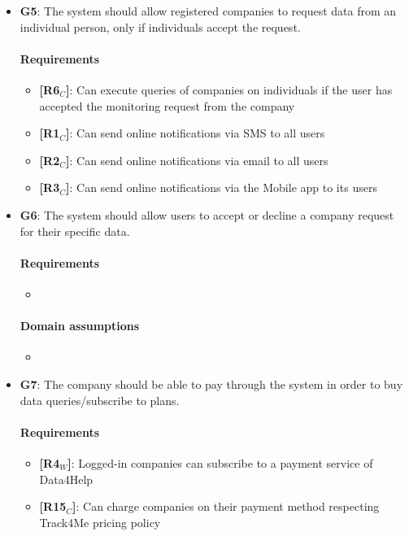 \begin{itemize}
    \item \textbf{G5}: The system should allow registered companies to request data from an individual person, only if individuals accept the request.
    \paragraph{Requirements}
   \begin{itemize}
      \item \textbf{[R6$_C$]}: Can execute queries of companies on individuals if the user has accepted the monitoring request from the company
      \item \textbf{[R1$_C$]}: Can send online notifications via SMS to all users 
    \item \textbf{[R2$_C$]}: Can send online notifications via email to all users
    \item \textbf{[R3$_C$]}: Can send online notifications via the Mobile app to its users
   \end{itemize}
    \item \textbf{G6}: The system should allow users to accept or decline a company request for their specific data.
    \paragraph{Requirements}
   \begin{itemize}
       \item 
   \end{itemize}
   \paragraph{Domain assumptions}
   \begin{itemize}
       \item 
   \end{itemize}
    \item \textbf{G7}: The company should be able to pay through the system in order to buy data queries/subscribe to plans.
    \paragraph{Requirements}
   \begin{itemize}
       \item \textbf{[R4$_W$]}: Logged-in companies can subscribe to a payment service of Data4Help
       \item \textbf{[R15$_C$]}: Can charge companies on their payment method respecting Track4Me pricing policy
   \end{itemize}

\end{itemize}
